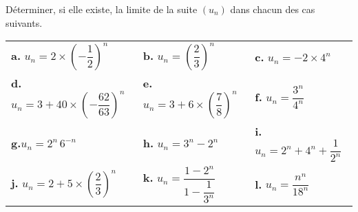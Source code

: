 \documentclass[11pt,fleqn, openany]{book} %
\begin{document}
\begin{exercise} Déterminer, si elle existe, la limite de la suite $(u_n)$ dans chacun des cas suivants.

\begin{center}
\begin{tabularx}{\linewidth}{XXX}
\textbf{a.} $ u_n = 2 \times \left(-\dfrac{1}{2}\right)^n$ & \textbf{b.} $u_n=\left(\dfrac{2}{3}\right)^n$ &
\textbf{c.} $u_n=-2\times 4^n$ \\
\textbf{d.} $u_n=3+40\times\left(-\dfrac{62}{63}\right)^n$ &\textbf{e.} $ u_n = 3+6\times \left(\dfrac{7}{8}\right)^n$ &\textbf{f.} $u_n=\dfrac{3^n}{4^n}$\\
\textbf{g.}$ u_n = 2^n\, 6^{-n}$ &\textbf{h.} $ u_n = 3^n-2^n$ &
\textbf{i.} $u_n=2^n + 4^n  + \dfrac{1}{2^n}$ \\ \textbf{j.} $u_n = 2+5\times \left( \dfrac{2}{3}\right)^n$ &
\textbf{k.} $u_n=\dfrac{1-2^{n}}{1-\dfrac{1}{3^n}}$ &\textbf{l.}  $u_n=\dfrac{n^n}{18^n}$

\end{tabularx}
\end{center}\end{exercise}
\end{document}
